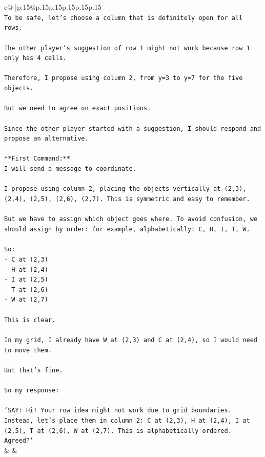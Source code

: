 \documentclass{article}
\begin{document}
{\begin{supertabular}{c@{$\;$}|p{.15\linewidth}@{}p{.15\linewidth}p{.15\linewidth}p{.15\linewidth}p{.15\linewidth}p{.15\linewidth}}
{{{\\ 
\texttt{To be safe, let's choose a column that is definitely open for all rows.} \\
\\ 
\texttt{The other player's suggestion of row 1 might not work because row 1 only has 4 cells.} \\
\\ 
\texttt{Therefore, I propose using column 2, from y=3 to y=7 for the five objects.} \\
\\ 
\texttt{But we need to agree on exact positions.} \\
\\ 
\texttt{Since the other player started with a suggestion, I should respond and propose an alternative.} \\
\\ 
\texttt{**First Command:**} \\
\texttt{I will send a message to coordinate.} \\
\\ 
\texttt{I propose using column 2, placing the objects vertically at (2,3), (2,4), (2,5), (2,6), (2,7). This is symmetric and easy to remember.} \\
\\ 
\texttt{But we have to assign which object goes where. To avoid confusion, we should assign by order: for example, alphabetically: C, H, I, T, W.} \\
\\ 
\texttt{So:} \\
\texttt{{-} C at (2,3)} \\
\texttt{{-} H at (2,4)} \\
\texttt{{-} I at (2,5)} \\
\texttt{{-} T at (2,6)} \\
\texttt{{-} W at (2,7)} \\
\\ 
\texttt{This is clear.} \\
\\ 
\texttt{In my grid, I already have W at (2,3) and C at (2,4), so I would need to move them.} \\
\\ 
\texttt{But that's fine.} \\
\\ 
\texttt{So my response:} \\
\\ 
\texttt{`SAY: Hi! Your row idea might not work due to grid boundaries. Instead, let's place them in column 2: C at (2,3), H at (2,4), I at (2,5), T at (2,6), W at (2,7). This is alphabetically ordered. Agreed?`} \\
            }
        }
    }
    & & \\ \\


\end{supertabular}}
\end{document}
